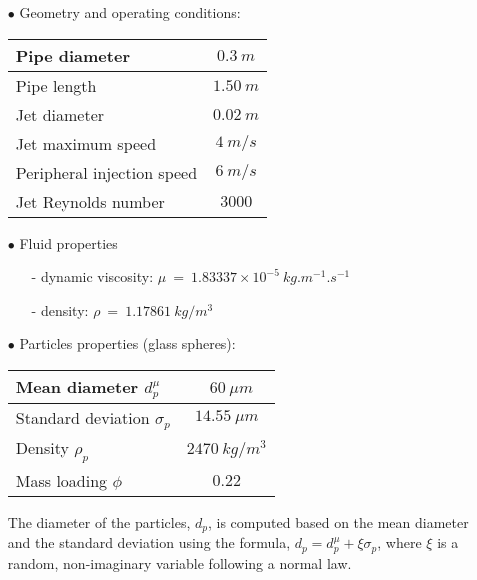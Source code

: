 \begin{itemize}

   \item[$\bullet$] Geometry and operating conditions:

         \begin{table}[!bth]
            \begin{center}
               \begin{tabular}{|l|c|} \hline
                  Pipe diameter              & $0.3~m $ \\ \hline
                  Pipe length                & $1.50~m$ \\ \hline
                  Jet diameter               & $0.02~m$ \\ \hline
                  Jet maximum speed          & $4 ~m/s$ \\ \hline
                  Peripheral injection speed & $6 ~m/s$ \\ \hline
                  Jet Reynolds number        & $3000$   \\ \hline
               \end{tabular}
            \end{center}
         \end{table}

   \item[$\bullet$] Fluid properties

         \begin{itemize}
            \item[-] dynamic viscosity: $\mu~=~1.83337 \times 10^{-5}~kg.m^{-1}.s^{-1}$
            \item[-] density: $\rho~=~1.17861~kg/m^3$
         \end{itemize}
         \vspace{5mm}

   \item[$\bullet$] Particles properties (glass spheres):

         \begin{table}[!bth]
            \begin{center}
               \begin{tabular}{|l|c|} \hline
                  Mean diameter $d_p^{\mu}$       & \  $60~ \mu m$   \\ \hline
                  Standard deviation $\sigma_{p}$ & $14.55 ~\mu m$   \\ \hline
                  Density $\rho_{p}$              & $2470 ~kg/m^{3}$ \\ \hline
                  Mass loading $\phi$             & $0.22$           \\ \hline
               \end{tabular}
            \end{center}
         \end{table}

         \noindent
         The diameter of the particles, $d_p$, is computed based on the mean diameter and the standard deviation using the formula, $d_p = d_p^\mu + \xi \sigma_{p}$, where $\xi$ is a random, non-imaginary variable following a normal law.

\end{itemize}

